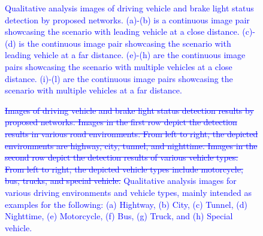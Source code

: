 \begin{figure}[t]%
    \captionsetup[subfigure]{justification=centering}

    \hfill
    \hfill

\caption{\textcolor{blue}{Qualitative analysis images of driving vehicle and brake light status detection by proposed networks. (a)-(b) is a continuous image pair showcasing the scenario with leading vehicle at a close distance. (c)-(d) is the continuous image pair showcasing the scenario with leading vehicle at a far distance. (e)-(h) are the continuous image pairs showcasing the scenario with multiple vehicles at a close distance. (i)-(l) are the continuous image pairs showcasing the scenario with multiple vehicles at a far distance.
}}
\label{fig:qualitative_perf}%
\end{figure}

\begin{figure}[t!]%

    \hfill

\caption{\textcolor{blue}{ \sout{Images of driving vehicle and brake light status detection results by proposed networks. Images in the first row depict the detection results in various road environments. From left to right, the depicted environments are highway, city, tunnel, and nighttime. Images in the second row depict the detection results of various vehicle types. From left to right, the depicted vehicle types include motorcycle, bus, trucks, and special vehicle.}
Qualitative analysis images for various driving environments and vehicle types, mainly intended as examples for the following: (a) Hightway, (b) City, (c) Tunnel, (d) Nighttime, (e) Motorcycle, (f) Bus, (g) Truck, and (h) Special vehicle.
}}
\label{fig:qualitative_env}%
\end{figure}




